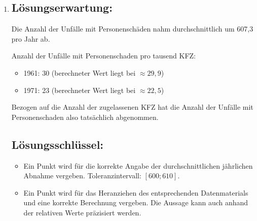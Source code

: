 \begin{langesbeispiel}
{\begin{enumerate}
	\subsection{Lösungsschlüssel:}
	
\begin{itemize}
	\item   Ein Punkt wird für die Angabe eines korrekten Funktionsterms vergeben. (Der Punkt kann auch vergeben werden, wenn eine andere Variable als $t$ verwendet wird.)  Toleranzintervall für die ersten Parameter: $[-0,08; -0,05]$.
	\item   Ein Punkt wird für die Angabe der entsprechenden Zeitspanne und/oder des entsprechenden Jahres vergeben. Toleranzintervalle: $[51 \text{ Jahre}; 70 \text{ Jahre}]$, $[2022; 2042]$.
 
\end{itemize}

\item \subsection{Lösungserwartung:}
			Die Anzahl der Unfälle mit Personenschäden nahm durchschnittlich um 607,3 pro Jahr ab.
			
			Anzahl der Unfälle mit Personenschaden pro tausend KFZ:
			
			\begin{itemize}
				\item 1961: 30 (berechneter Wert liegt bei $\approx 29,9$)
				\item 1971: 23 (berechneter Wert liegt bei $\approx 22,5$)
			\end{itemize}
			
			Bezogen auf die Anzahl der zugelassenen KFZ hat die Anzahl der Unfälle mit Personenschaden also tatsächlich abgenommen.
		
	\subsection{Lösungsschlüssel:}
	
\begin{itemize}
	\item   Ein Punkt wird für die korrekte Angabe der durchschnittlichen jährlichen Abnahme vergeben. Toleranzintervall: $[600; 610]$.
	\item   Ein Punkt wird für das Heranziehen des entsprechenden Datenmaterials und eine korrekte Berechnung vergeben. Die Aussage kann auch anhand der relativen Werte präzisiert werden. 
\end{itemize}


\end{enumerate}}
\end{langesbeispiel}
